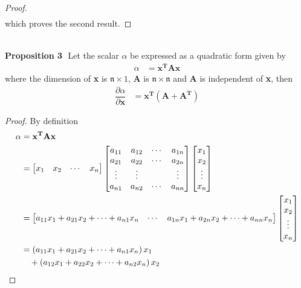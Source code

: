 \documentclass[14pt]{extarticle}
\begin{document}
\begin{flushleft}
\begin{large}
\begin{proof}
\begin{align}
\end{align}
which proves the second result.
\end{proof}
 \\
\hfill \break
\hfill \break
\textbf{Proposition 3} \,\,Let the scalar $\alpha$ be expressed as a quadratic form given by
\begin{align}
\alpha &= \mathbf{x^TAx}
\end{align}
where the dimension of \textbf{x} is $\mathfrak{n} \times 1$, \textbf{A} is $\mathfrak{n} \times \mathfrak{n}$ and \textbf{A} is independent of \textbf{x}, then
\begin{align}
\dfrac{\partial \alpha}{\partial \mathbf{x}} &= \mathbf{x^T \left(A+A^T\right)}
\end{align}
\begin{proof}
By definition
\begin{align}
\alpha &= \mathbf{x^TAx}\\
&= \begin{bmatrix}
x_1 & x_2 & \cdots & x_n
\end{bmatrix}
\begin{bmatrix}
a_{11} & a_{12} & \cdots & a_{1n} \\
a_{21} & a_{22} & \cdots & a_{2n} \\
\vdots & \vdots & & \vdots \\
a_{n1} & a_{n2} & \cdots & a_{nn}
\end{bmatrix}
\begin{bmatrix}
x_1 \\
x_2 \\
\vdots \\
x_n
\end{bmatrix}\\
&= \begin{bmatrix}
a_{11}x_1 + a_{21}x_2 + \cdots + a_{n1}x_n & \cdots & a_{1n}x_1 + a_{2n}x_2 + \cdots + a_{nn}x_n 
\end{bmatrix}
\begin{bmatrix}
x_1 \\
x_2 \\
\vdots \\
x_n
\end{bmatrix}\\
&= \left(a_{11}x_1 + a_{21}x_2 + \cdots + a_{n1}x_n\right)x_1 \\
&\,\,\,\,\,\,+ \left(a_{12}x_1 + a_{22}x_2 + \cdots + a_{n2}x_n\right)x_2 {\notag} \\

\end{align}
\end{proof}
\end{large}
\end{flushleft}
\end{document}
